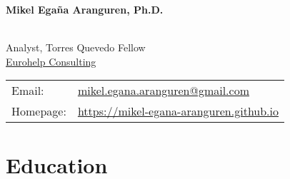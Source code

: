 \documentclass[11pt,fullpage]{article}
\newcommand{\etc}{\emph{etc.}}
\def\name{Mikel Ega\~na Aranguren, Ph.D.}
\begin{document}


\centerline{\Large \bf \name}

\vspace{0.25in}

\begin{minipage}{0.50\linewidth}
~\\
    Analyst, Torres Quevedo Fellow \\
    \href{http://eurohelp.es/}{Eurohelp Consulting} \\




\end{minipage}
\begin{minipage}{0.50\linewidth}
  \begin{tabular}{ll}
    Email: & \href{mailto:mikel.egana.aranguren@gmail.com}{mikel.egana.aranguren@gmail.com} \\
    Homepage: & \href{https://mikel-egana-aranguren.github.io}{https://mikel-egana-aranguren.github.io}

  \end{tabular}
\end{minipage}

\section*{Education}
\end{document}
